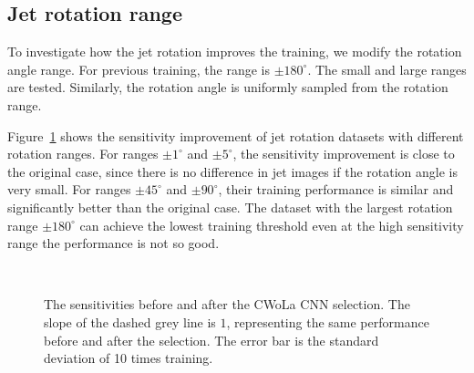 \documentclass[12pt]{article}
\begin{document}
	\subsection{Jet rotation range}%
	\label{sub:jet_rotation_range}
		To investigate how the jet rotation improves the training, we modify the rotation angle range. For previous training, the range is $\pm 180^\circ$. The small and large ranges are tested. Similarly, the rotation angle is uniformly sampled from the rotation range.

		Figure~\ref{fig:sensitivity_improvement_origin_jet_aug_5_range_1_5_45_90_180} shows the sensitivity improvement of jet rotation datasets with different rotation ranges. For ranges $\pm 1^\circ$ and $\pm 5^\circ$, the sensitivity improvement is close to the original case, since there is no difference in jet images if the rotation angle is very small. For ranges $\pm 45^\circ$ and  $\pm 90^\circ$, their training performance is similar and significantly better than the original case. The dataset with the largest rotation range $\pm 180^\circ$ can achieve the lowest training threshold even at the high sensitivity range the performance is not so good.
		\begin{figure}[htpb]
			\centering
			 \\
			\caption{The sensitivities before and after the CWoLa CNN selection. The slope of the dashed grey line is $1$, representing the same performance before and after the selection. The error bar is the standard deviation of 10 times training.}
			\label{fig:sensitivity_improvement_origin_jet_aug_5_range_1_5_45_90_180}
		\end{figure}
\end{document}
